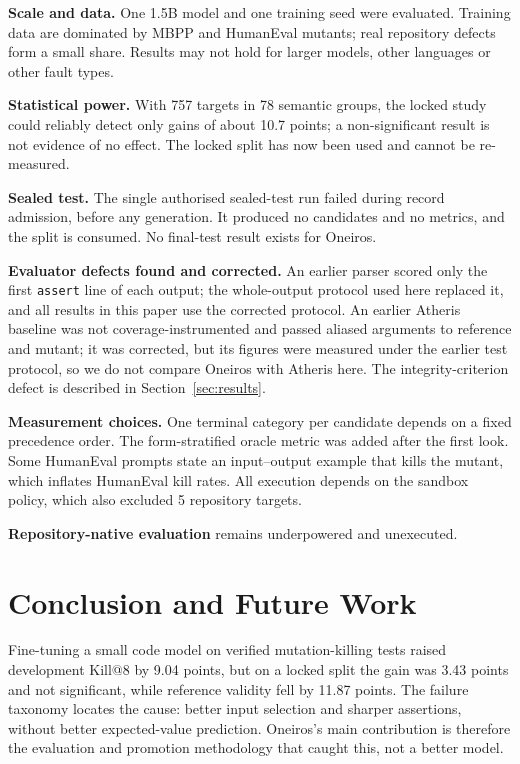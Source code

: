\documentclass[conference,a4paper]{IEEEtran}
\makeatletter
\newcommand{\killk}[1]{Kill@#1}
\makeatother
\begin{document}
\textbf{Scale and data.} One 1.5B model and one training seed were evaluated. Training
data are dominated by MBPP and HumanEval mutants; real repository defects form a
small share. Results may not hold for larger models, other languages or other fault
types.

\textbf{Statistical power.} With 757 targets in 78 semantic groups, the locked study
could reliably detect only gains of about 10.7 points; a non-significant result is not
evidence of no effect. The locked split has now been used and cannot be re-measured.

\textbf{Sealed test.} The single authorised sealed-test run failed during record
admission, before any generation. It produced no candidates and no metrics, and the
split is consumed. No final-test result exists for Oneiros.

\textbf{Evaluator defects found and corrected.} An earlier parser scored only the first
\texttt{assert} line of each output; the whole-output protocol used here replaced it,
and all results in this paper use the corrected protocol. An earlier Atheris baseline
was not coverage-instrumented and passed aliased arguments to reference and mutant; it
was corrected, but its figures were measured under the earlier test protocol, so we do
not compare Oneiros with Atheris here. The integrity-criterion defect is described in
Section~\ref{sec:results}.

\textbf{Measurement choices.} One terminal category per candidate depends on a fixed
precedence order. The form-stratified oracle metric was added after the first look.
Some HumanEval prompts state an input--output example that kills the mutant, which
inflates HumanEval kill rates. All execution depends on the sandbox policy, which also
excluded 5 repository targets.

\textbf{Repository-native evaluation} remains underpowered and unexecuted.

\section{Conclusion and Future Work}

Fine-tuning a small code model on verified mutation-killing tests raised development
\killk{8} by 9.04 points, but on a locked split the gain was 3.43 points and not
significant, while reference validity fell by 11.87 points. The failure taxonomy
locates the cause: better input selection and sharper assertions, without better
expected-value prediction. Oneiros's main contribution is therefore the evaluation and
promotion methodology that caught this, not a better model.
\end{document}
